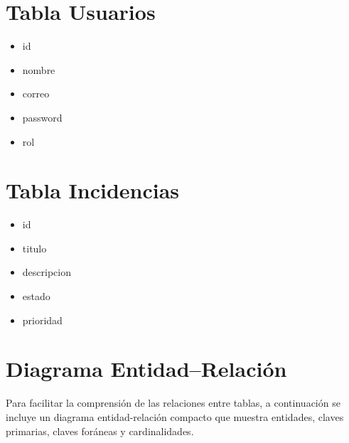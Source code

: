 \documentclass[12pt,letterpaper,oneside]{extreport}
\begin{document}
\section{Tabla Usuarios}

\begin{itemize}
    \item id
    
    \item nombre
    
    \item correo
    
    \item password
    
    \item rol
\end{itemize}

\section{Tabla Incidencias}

\begin{itemize}
    \item id
    
    \item titulo
    
    \item descripcion
    
    \item estado
    
    \item prioridad
\end{itemize}

\newpage
\section{Diagrama Entidad--Relación}
Para facilitar la comprensión de las relaciones entre tablas, a continuación se incluye un diagrama entidad-relación compacto que muestra entidades, claves primarias, claves foráneas y cardinalidades.
\end{document}
